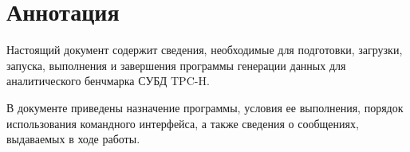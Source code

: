 \section*{Аннотация}

Настоящий документ содержит сведения, необходимые для подготовки,
загрузки, запуска, выполнения и завершения программы генерации данных для
аналитического бенчмарка СУБД TPC-H.

В документе приведены назначение программы, условия ее выполнения, порядок
использования командного интерфейса, а также сведения о сообщениях, выдаваемых
в ходе работы.

